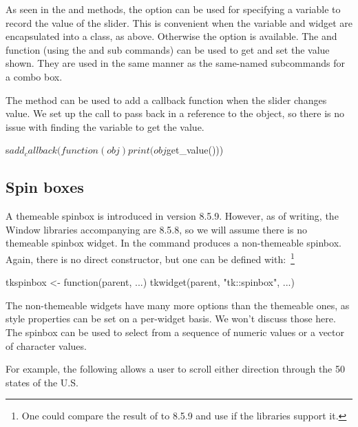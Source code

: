 As seen in the  and  methods, the
 option can be used for specifying a \TCL\/
variable to record the value of the slider. This is convenient when
the variable and widget are encapsulated into a class, as
above. Otherwise the  option is available.
The  and  function (using the
 and  sub
commands) can be used to get and set the value shown. They are used in
the same manner as the same-named subcommands for a combo box.

The  method can be used to add a callback function
when the slider changes value. We set up the call to pass back in a
reference to the object, so there is no issue with finding the \TCL\/
variable to get the value.
\begin{Schunk}
\begin{Sinput}
 s$add_callback(function(obj) print(obj$get_value()))
\end{Sinput}
\end{Schunk}


\subsection{Spin boxes}
\label{sec:tcltk:spinboxes}

A themeable spinbox is introduced in \TK\/ version 8.5.9. However,  as of
writing, the Window libraries accompanying \R{} are 8.5.8, so we will
assume there is no themeable spinbox widget. In \TK\/ the
 command produces a non-themeable spinbox. Again, there
is no direct  constructor, but one can be
defined with:~\footnote{One could compare the result of
   to 8.5.9 and use
   if the libraries support it.}
\begin{Schunk}
\begin{Sinput}
 tkspinbox <- function(parent, ...) 
     tkwidget(parent, "tk::spinbox", ...)
\end{Sinput}
\end{Schunk}

The non-themeable widgets have many more options than the themeable
ones, as style properties can be set on a per-widget basis. We won't
discuss those here. The spinbox can be used to select from a sequence
of numeric values or a vector of character values.


For example, the following allows a user to scroll either direction through the 50
states of the U.S.

